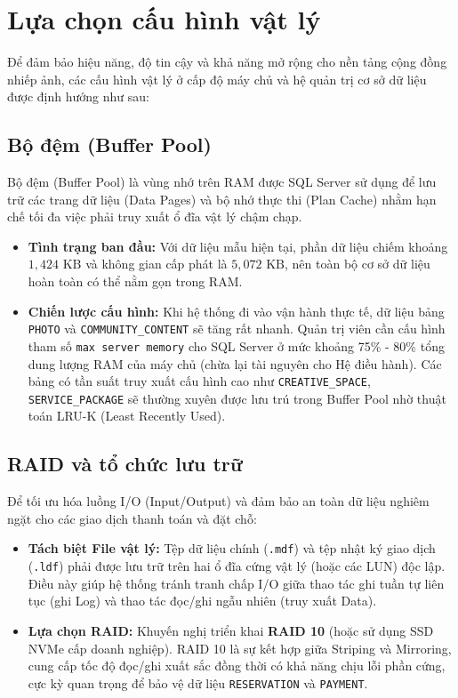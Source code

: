 \section{Lựa chọn cấu hình vật lý}
Để đảm bảo hiệu năng, độ tin cậy và khả năng mở rộng cho nền tảng cộng đồng nhiếp ảnh, các cấu hình vật lý ở cấp độ máy chủ và hệ quản trị cơ sở dữ liệu được định hướng như sau:

\subsection{Bộ đệm (Buffer Pool)}
Bộ đệm (Buffer Pool) là vùng nhớ trên RAM được SQL Server sử dụng để lưu trữ các trang dữ liệu (Data Pages) và bộ nhớ thực thi (Plan Cache) nhằm hạn chế tối đa việc phải truy xuất ổ đĩa vật lý chậm chạp.
\begin{itemize}
	\item \textbf{Tình trạng ban đầu:} Với dữ liệu mẫu hiện tại, phần dữ liệu chiếm khoảng $1{,}424\text{ KB}$ và không gian cấp phát là $5{,}072\text{ KB}$, nên toàn bộ cơ sở dữ liệu hoàn toàn có thể nằm gọn trong RAM.
    \item \textbf{Chiến lược cấu hình:} Khi hệ thống đi vào vận hành thực tế, dữ liệu bảng \texttt{PHOTO} và \texttt{COMMUNITY\_CONTENT} sẽ tăng rất nhanh. Quản trị viên cần cấu hình tham số \texttt{max server memory} cho SQL Server ở mức khoảng 75\% - 80\% tổng dung lượng RAM của máy chủ (chừa lại tài nguyên cho Hệ điều hành). Các bảng có tần suất truy xuất cấu hình cao như \texttt{CREATIVE\_SPACE}, \texttt{SERVICE\_PACKAGE} sẽ thường xuyên được lưu trú trong Buffer Pool nhờ thuật toán LRU-K (Least Recently Used).
\end{itemize}

\subsection{RAID và tổ chức lưu trữ}
Để tối ưu hóa luồng I/O (Input/Output) và đảm bảo an toàn dữ liệu nghiêm ngặt cho các giao dịch thanh toán và đặt chỗ:
\begin{itemize}
    \item \textbf{Tách biệt File vật lý:} Tệp dữ liệu chính (\texttt{.mdf}) và tệp nhật ký giao dịch (\texttt{.ldf}) phải được lưu trữ trên hai ổ đĩa cứng vật lý (hoặc các LUN) độc lập. Điều này giúp hệ thống tránh tranh chấp I/O giữa thao tác ghi tuần tự liên tục (ghi Log) và thao tác đọc/ghi ngẫu nhiên (truy xuất Data).
    \item \textbf{Lựa chọn RAID:} Khuyến nghị triển khai \textbf{RAID 10} (hoặc sử dụng SSD NVMe cấp doanh nghiệp). RAID 10 là sự kết hợp giữa Striping và Mirroring, cung cấp tốc độ đọc/ghi xuất sắc đồng thời có khả năng chịu lỗi phần cứng, cực kỳ quan trọng để bảo vệ dữ liệu \texttt{RESERVATION} và \texttt{PAYMENT}.
\end{itemize}

